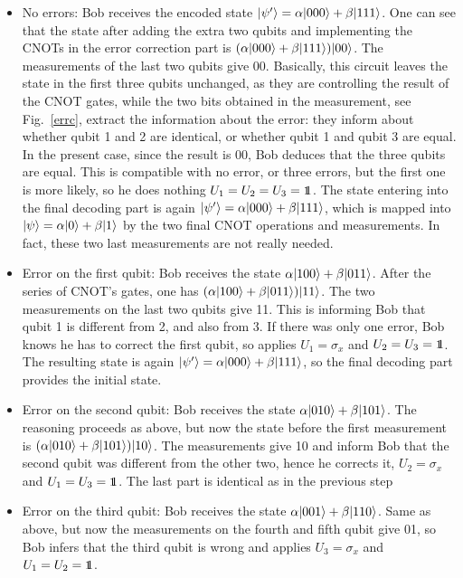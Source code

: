 \documentclass[a4paper]{article}
\def\one{\leavevmode\hbox{\small1\normalsize\kern-.33em1}}
\begin{document}
\begin{itemize}
    \item No errors: Bob receives the encoded state
    $|\psi'\rangle=\alpha|000\rangle+\beta|111\rangle$. One can see that the state after adding the extra two qubits and implementing the CNOTs in the error correction part is $(\alpha|000\rangle+\beta|111\rangle)|00\rangle$. The measurements of the last two qubits give $00$. Basically, this circuit leaves the state in the first three qubits unchanged, as they are controlling the result of the CNOT gates, while the two bits obtained in the measurement, see Fig.~\ref{errc}, extract the information about the error: they inform about whether qubit 1 and 2 are identical, or whether qubit 1 and qubit 3 are equal. In the present case, since the result is 00, Bob deduces that the three qubits are equal. This is compatible with no error, or three errors, but the first one is more likely, so he does nothing $U_1=U_2=U_3=\one$. The state entering into the final decoding part is again  $|\psi'\rangle=\alpha|000\rangle+\beta|111\rangle$, which is mapped into $|\psi\rangle=\alpha|0\rangle+\beta|1\rangle$ by the two final CNOT operations and measurements. In fact, these two last measurements are not really needed.
    \item Error on the first qubit: Bob receives the state
    $\alpha|100\rangle+\beta|011\rangle$. After the series of CNOT's
    gates, one has $(\alpha|100\rangle+\beta|011\rangle)|11\rangle$. The two measurements on the last two qubits give 11. This is informing Bob that qubit 1 is different from 2, and also from 3. If there was only one error, Bob knows he has to correct the first qubit, so
    applies $U_1=\sigma_x$ and $U_2=U_3=\one$. The resulting state is again $|\psi'\rangle=\alpha|000\rangle+\beta|111\rangle$, so the final decoding part
    provides the initial state.
    \item Error on the second qubit: Bob receives the state
    $\alpha|010\rangle+\beta|101\rangle$. The reasoning proceeds as
    above, but now the state before the first measurement is $(\alpha|010\rangle+\beta|101\rangle)|10\rangle$. The measurements give 10 and inform Bob that the second qubit was different from the other two, hence he corrects it, $U_2=\sigma_x$ and $U_1=U_3=\one$. The last part is identical as in the previous step
    \item Error on the third qubit: Bob receives the state
    $\alpha|001\rangle+\beta|110\rangle$. Same as above, but now the
    measurements on the fourth and fifth qubit give 01, so Bob infers that the third qubit is wrong and applies $U_3=\sigma_x$ and
    $U_1=U_2=\one$.
\end{itemize}
\end{document}
